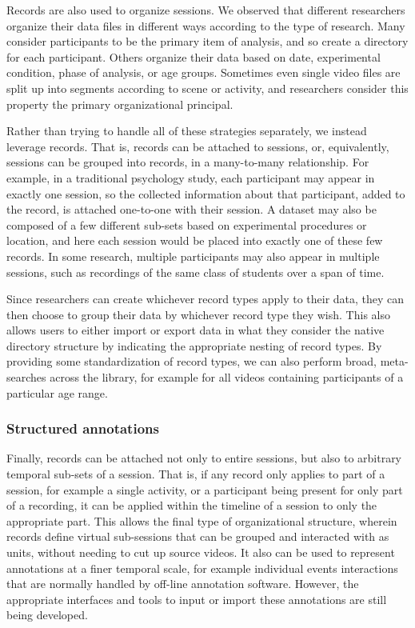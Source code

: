 \documentclass{sig-alternate}
\begin{document}
Records are also used to organize sessions.
We observed that different researchers organize their data files in different ways according to the type of research.
Many consider participants to be the primary item of analysis, and so create a directory for each participant.
Others organize their data based on date, experimental condition, phase of analysis, or age groups.
Sometimes even single video files are split up into segments according to scene or activity, and researchers consider this property the primary organizational principal.

Rather than trying to handle all of these strategies separately, we instead leverage records.
That is, records can be attached to sessions, or, equivalently, sessions can be grouped into records, in a many-to-many relationship.
For example, in a traditional psychology study, each participant may appear in exactly one session, so the collected information about that participant, added to the record, is attached one-to-one with their session.
A dataset may also be composed of a few different sub-sets based on experimental procedures or location, and here each session would be placed into exactly one of these few records.
In some research, multiple participants may also appear in multiple sessions, such as recordings of the same class of students over a span of time.

Since researchers can create whichever record types apply to their data, they can then choose to group their data by whichever record type they wish.
This also allows users to either import or export data in what they consider the native directory structure by indicating the appropriate nesting of record types.
By providing some standardization of record types, we can also perform broad, meta-searches across the library, for example for all videos containing participants of a particular age range.

\subsubsection*{Structured annotations}

Finally, records can be attached not only to entire sessions, but also to arbitrary temporal sub-sets of a session.
That is, if any record only applies to part of a session, for example a single activity, or a participant being present for only part of a recording, it can be applied within the timeline of a session to only the appropriate part.
This allows the final type of organizational structure, wherein records define virtual sub-sessions that can be grouped and interacted with as units, without needing to cut up source videos.
It also can be used to represent annotations at a finer temporal scale, for example individual events interactions that are normally handled by off-line annotation software.
However, the appropriate interfaces and tools to input or import these annotations are still being developed.
\end{document}
